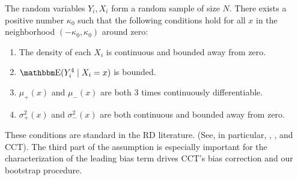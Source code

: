 \documentclass[12pt,fleqn]{article}
\begin{document}
\begin{assumption}\label{A1}
  The random variables $Y_i, X_i$ form a random sample of size $N$.
  There exists a positive number $\kappa_0$ such that the following
  conditions hold for all $x$ in the neighborhood $(-\kappa_{0},\kappa_{0})$
  around zero:
  \begin{enumerate}
  \item The density of each $X_i$ is continuous and bounded away from zero.
  \item $\E(Y_{i}^{4} \mid X_{i}=x)$ is bounded.
  \item $\mu_+(x)$ and $\mu_-(x)$ are both 3 times continuously differentiable.
  \item $\sigma_+^2(x)$ and $\sigma_-^2(x)$ are both continuous and bounded away
    from zero.
 \end{enumerate}
\end{assumption}

These conditions are standard in the RD literature. (See, in particular,
\citealp{HTV2001}, \citealp{Porter03}, and CCT). The third part of the
assumption is especially important for the characterization of the leading bias
term drives CCT's bias correction and our bootstrap procedure.
\end{document}
